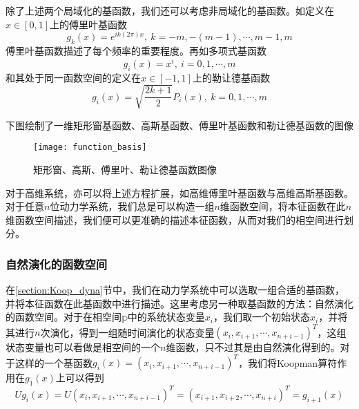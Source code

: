 除了上述两个局域化的基函数，我们还可以考虑非局域化的基函数。如定义在$x\in [0,1]$上的傅里叶基函数
\begin{equation}
    g_k(x)=e^{ik(2\pi)x},\ k=-m,-(m-1),\cdots,m-1,m
\end{equation}
傅里叶基函数描述了每个频率的重要程度。再如多项式基函数
\begin{equation}
    g_i(x)=x^i,\ i=0,1,\cdots,m
\end{equation}
和其处于同一函数空间的定义在$x\in [-1,1]$上的勒让德基函数
\begin{equation}
    g_i(x)=\sqrt{\dfrac{2k+1}{2}}P_i(x),\ k=0,1,\cdots,m
\end{equation}

下图绘制了一维矩形窗基函数、高斯基函数、傅里叶基函数和勒让德基函数的图像
\begin{figure}
	\centering
	\texttt{[image: function\_basis]}
    \caption{矩形窗、高斯、傅里叶、勒让德基函数图像}
    \label{fig:func_bas}
\end{figure}

对于高维系统，亦可以将上述方程扩展，如高维傅里叶基函数与高维高斯基函数。对于任意$n$位动力学系统，我们总是可以构造一组$n$维函数空间，将本征函数在此$n$维函数空间描述，我们便可以更准确的描述本征函数，从而对我们的相空间进行划分。

\subsubsection{自然演化的函数空间}

在\ref{section:Koop_dyna}节中，我们在动力学系统中可以选取一组合适的基函数，并将本征函数在此基函数中进行描述。这里考虑另一种取基函数的方法：自然演化的函数空间。对于在相空间$\mathbb{p}$中的系统状态变量$x_i$，我们取一个初始状态$x_i$，并将其进行$n$次演化，得到一组随时间演化的状态变量$(x_i,x_{i+1},\cdots,x_{n+i-1})^T$，这组状态变量也可以看做是相空间的一个$n$维函数，只不过其是由自然演化得到的。对于这样的一个基函数$g_i(x)=(x_i,x_{i+1},\cdots,x_{n+i-1})^T$，我们将Koopman算符作用在$g_1(x)$上可以得到
\begin{equation}
    Ug_i(x)=U(x_i,x_{i+1},\cdots,x_{n+i-1})^T=(x_{i+1},x_{i+2},\cdots,x_{n+i})^T=g_{i+1}(x)
\end{equation}

